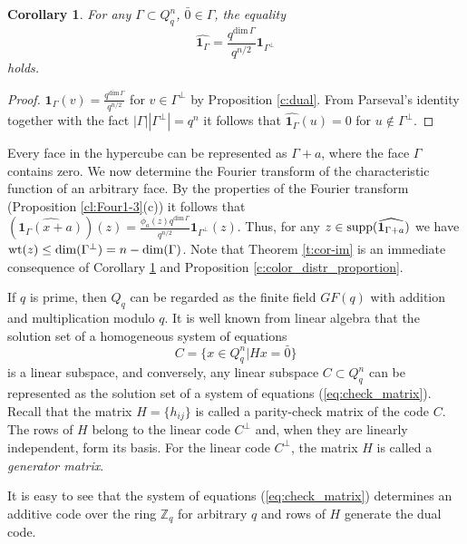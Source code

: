 \documentclass[11pt]{article}
\newtheorem{corollary}{Corollary}[section]
\theoremstyle{definition}
\newcommand{\supp}{{\rm supp}}
\newcommand{\wt}{{\rm wt}}
\begin{document}
{{{\begin{corollary}\label{cor:face}
For any  $\Gamma\subset Q^n_q$, $\bar{0}\in \Gamma$, the equality
\[
    \widehat{{\mathbf 1}_{\Gamma}}=\frac{q^{\mathrm{dim}\,\Gamma}}{q^{n/2}}{\mathbf 1}_{{\Gamma^\perp}}
    \]
holds.
\end{corollary}
\begin{proof}
$\widehat{{\mathbf 1}_{\Gamma}}(v)=\frac{q^{\mathrm{dim}\,\Gamma}}{q^{n/2}}$
for $v\in \Gamma^\perp$ by Proposition \ref{c:dual}. From Parseval's
identity together with the fact $|\Gamma||\Gamma^\perp|=q^n$  it follows that 
$\widehat{{\mathbf 1}_{\Gamma}}(u)=0$ for $u\not\in
\Gamma^\perp$. \end{proof}

Every face in the hypercube can be represented as $\Gamma +a$,
where the face $\Gamma$ contains zero. We now determine the Fourier transform
of the characteristic function of an arbitrary face. By the properties
of the Fourier transform (Proposition \ref{cl:Four1-3}(c)) it follows that
$(\widehat{{\mathbf 1}_\Gamma(x+a)})(z)=
\frac{\phi_a(z)q^{\mathrm{dim}\,\Gamma}}{q^{n/2}}{\mathbf 1}_{\Gamma^\perp}(z)$.
Thus, for any $z\in \supp(\widehat{{\mathbf 1}_{\Gamma+a}})$
we have $\wt(z)\leq \dim(\Gamma^\perp)=n-\dim(\Gamma)$.
Note that Theorem \ref{t:cor-im}
    is an immediate consequence of Corollary  \ref{cor:face} and 
  Proposition
\ref{c:color_distr_proportion}. 



If $q$
is prime, then $Q_q$ can be regarded as the finite field
$GF(q)$ with addition and multiplication modulo $q$. 
It is well known from linear algebra that the solution set of a homogeneous system of equations
\begin{equation}\label{eq:check_matrix}
C=\{x\in Q_q^n | Hx=\bar{0}\}
\end{equation}
 is a linear
subspace, and conversely, any linear subspace $C\subset
Q_q^n$ can be represented as the solution set of a system of equations
(\ref{eq:check_matrix}). Recall that the matrix $H=\{h_{ij}\}$ is called a
parity-check matrix of the code $C$.  The rows of $H$ belong to the
linear code $C^\perp$ and, when they are linearly independent,
form its basis. For the linear code $C^\perp$, the matrix $H$
is called a {\sl generator matrix}.

It is easy to see that the system of equations (\ref{eq:check_matrix}) determines an additive code over
the  ring $\mathbb{Z}_q$ for arbitrary $q$ and rows of $H$ generate the dual code. 

}}}
\end{document}
